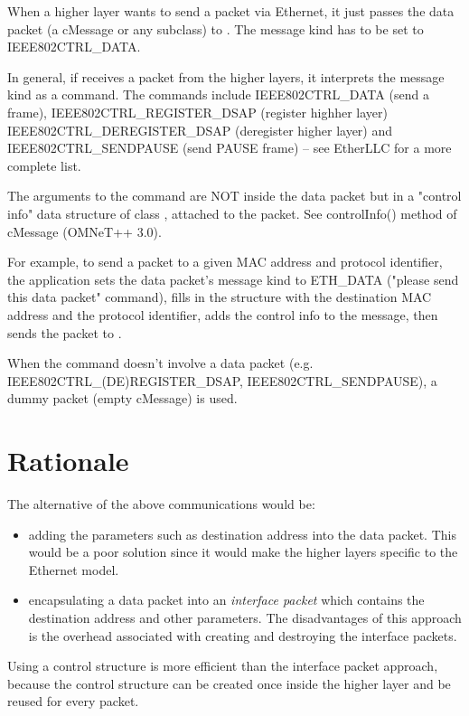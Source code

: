 When a higher layer wants to send a packet via Ethernet, it just
passes the data packet (a cMessage or any subclass) to .
The message kind has to be set to IEEE802CTRL\_DATA.

In general, if  receives a packet from the higher layers,
it interprets the message kind as a command. The commands include
IEEE802CTRL\_DATA (send a frame), IEEE802CTRL\_REGISTER\_DSAP (register highher layer)
IEEE802CTRL\_DEREGISTER\_DSAP (deregister higher layer) and IEEE802CTRL\_SENDPAUSE
(send PAUSE frame) -- see EtherLLC for a more complete list.

The arguments to the command are NOT inside the data packet but
in a "control info" data structure of class , attached to
the packet. See controlInfo() method of cMessage (OMNeT++ 3.0).

For example, to send a packet to a given MAC address and protocol
identifier, the application sets the data packet's message kind
to ETH\_DATA ("please send this data packet" command),
fills in the  structure with the destination MAC address and
the protocol identifier, adds the control info to the message, then sends
the packet to .

When the command doesn't involve a data packet (e.g.
IEEE802CTRL\_(DE)REGISTER\_DSAP, IEEE802CTRL\_SENDPAUSE), a dummy packet
(empty cMessage) is used.

\section{Rationale}

The alternative of the above communications would be:

\begin{itemize}
  \item adding the parameters such as destination address into the data
    packet. This would be a poor solution since it would make the
    higher layers specific to the Ethernet model.
  \item encapsulating a data packet into an \textit{interface packet} which
    contains the destination address and other parameters. The
    disadvantages of this approach is the overhead associated with
    creating and destroying the interface packets.
\end{itemize}

Using a control structure is more efficient than the interface packet
approach, because the control structure can be created once inside
the higher layer and be reused for every packet.

